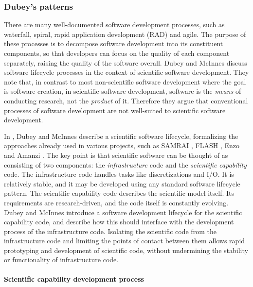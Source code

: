 \subsubsection{Dubey's patterns}\label{sec:dubey}

There are many well-documented software development processes, such as waterfall, spiral,
rapid application development (RAD) and agile.
The purpose of these processes is to decompose software development into its
constituent components, so that developers can focus on the
quality of each component separately, raising the quality of the software
overall.
Dubey and McInnes \cite{Du16Idea} discuss software lifecycle processes in the
context of scientific software development.
They note that, in contrast to most non-scientific software development where
the goal is software creation, in scientific software development, software is
the \emph{means} of conducting research, not the \emph{product} of it.
Therefore they argue that conventional processes of software development are not
well-suited to scientific software development.

In \cite{Du16Idea}, Dubey and McInnes describe a scientific software lifecycle,
formalizing the approaches already used in various projects, such as
SAMRAI \cite{SAMRAI}, FLASH \cite{Du09Exte}, Enzo \cite{Br14ENZO} and Amanzi
\cite{Mo14Aman}.
The key point is that scientific software can be thought of as consisting of
two components:
the \emph{infrastructure} code 
and the \emph{scientific capability} code.
The infrastructure code handles tasks like discretizations and I/O.
It is relatively stable, and it may be developed using any standard software
lifecycle pattern.
The scientific capability code describes the scientific model itself.
Its requirements are research-driven, and the code itself is constantly
evolving.
Dubey and McInnes introduce a software development lifecycle for the scientific
capability code, and describe how this should interface with the
development process of the infrastructure code.
Isolating the scientific code from the infrastructure code and limiting the
points of contact between them allows rapid prototyping and development of
scientific code, without undermining the stability or functionality of
infrastructure code.

\paragraph{Scientific capability development process}

